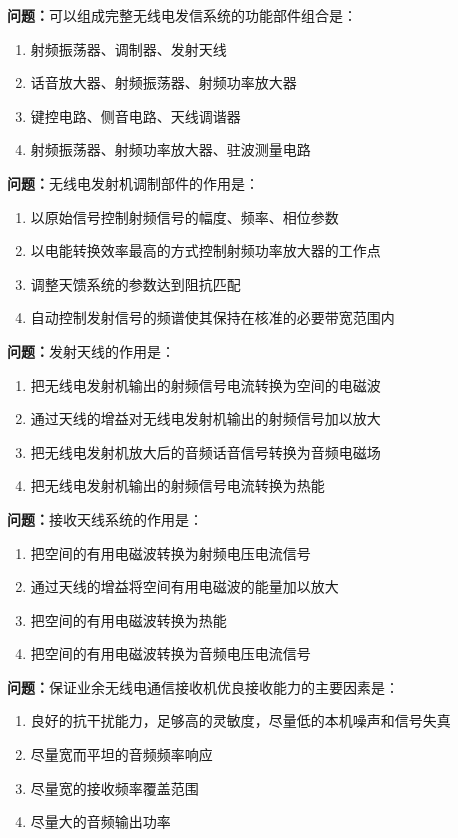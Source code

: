 \documentclass{ctexbook}
\begin{document}
\textbf{问题：}可以组成完整无线电发信系统的功能部件组合是：
\begin{enumerate}[label=\Alph*), leftmargin=3em]
\item 射频振荡器、调制器、发射天线
\item 话音放大器、射频振荡器、射频功率放大器
\item 键控电路、侧音电路、天线调谐器
\item 射频振荡器、射频功率放大器、驻波测量电路
\end{enumerate}

\textbf{问题：}无线电发射机调制部件的作用是：
\begin{enumerate}[label=\Alph*), leftmargin=3em]
\item 以原始信号控制射频信号的幅度、频率、相位参数
\item 以电能转换效率最高的方式控制射频功率放大器的工作点
\item 调整天馈系统的参数达到阻抗匹配
\item 自动控制发射信号的频谱使其保持在核准的必要带宽范围内
\end{enumerate}

\textbf{问题：}发射天线的作用是：
\begin{enumerate}[label=\Alph*), leftmargin=3em]
\item 把无线电发射机输出的射频信号电流转换为空间的电磁波
\item 通过天线的增益对无线电发射机输出的射频信号加以放大
\item 把无线电发射机放大后的音频话音信号转换为音频电磁场
\item 把无线电发射机输出的射频信号电流转换为热能
\end{enumerate}

\textbf{问题：}接收天线系统的作用是：
\begin{enumerate}[label=\Alph*), leftmargin=3em]
\item 把空间的有用电磁波转换为射频电压电流信号
\item 通过天线的增益将空间有用电磁波的能量加以放大
\item 把空间的有用电磁波转换为热能
\item 把空间的有用电磁波转换为音频电压电流信号
\end{enumerate}

\textbf{问题：}保证业余无线电通信接收机优良接收能力的主要因素是：
\begin{enumerate}[label=\Alph*), leftmargin=3em]
\item 良好的抗干扰能力，足够高的灵敏度，尽量低的本机噪声和信号失真
\item 尽量宽而平坦的音频频率响应
\item 尽量宽的接收频率覆盖范围
\item 尽量大的音频输出功率
\end{enumerate}
\end{document}
